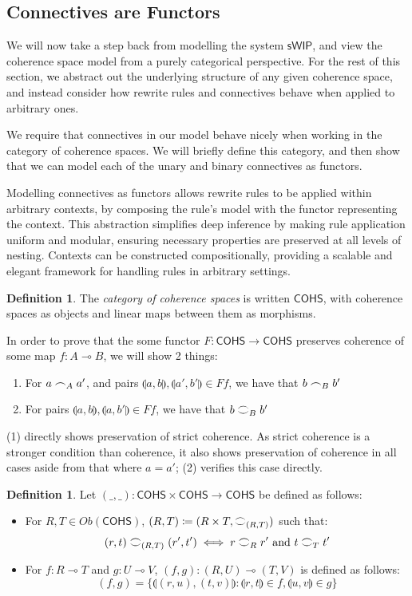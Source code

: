 \documentclass[12pt, oneside]{article}
\theoremstyle{plain}
\theoremstyle{definition}
\newtheorem{definition}[theorem]{Definition}
\newcommand{\lp}{\llparenthesis}
\newcommand{\rp}{\rrparenthesis}
\newcommand{\sSys}{{\mathsf{sWIP}}}%
\newcommand{\cohs}{{\mathsf{COHS}}}
\newcommand{\coh}[1][]{\mathrel{\vcenter{\offinterlineskip\hbox{$\frown$}\vskip0.2ex\hbox{$\smile$}}_{\ifx\\#1\\\else#1\fi}}}
\newcommand{\scoh}[1][]{\mathrel{\frown}_{\ifx\\#1\\\else#1\fi}}
\begin{document}
\subsection{Connectives are Functors}

We will now take a step back from modelling the system $\sSys$, and view the coherence space model from a purely categorical perspective.
For the rest of this section, we abstract out the underlying structure of any given coherence space, and instead consider how rewrite rules and connectives behave when applied to arbitrary ones.

We require that connectives in our model behave nicely when working in the category of coherence spaces.
We will briefly define this category, and then show that we can model each of the unary and binary connectives as functors.

Modelling connectives as functors allows rewrite rules to be applied within arbitrary contexts, by composing the rule's model with the functor representing the context.
This abstraction simplifies deep inference by making rule application uniform and modular, ensuring necessary properties are preserved at all levels of nesting.
Contexts can be constructed compositionally, providing a scalable and elegant framework for handling rules in arbitrary settings.

\begin{definition}
    The \textit{category of coherence spaces} is written $\cohs$, with coherence spaces as objects and linear maps between them as morphisms.
\end{definition}

In order to prove that the some functor $F:\cohs\to\cohs$ preserves coherence of some map $f:A\multimap B$, we will show 2 things:
\begin{enumerate}
    \item
    For $a\scoh[A]a'$, and pairs $\lp a,b\rp,\lp a',b'\rp\in Ff$, we have that $b\scoh[B]b'$
    \item 
    For pairs $\lp a,b\rp,\lp a,b'\rp\in Ff$, we have that $b\coh[B]b'$
\end{enumerate}
(1) directly shows preservation of strict coherence. As strict coherence is a stronger condition than coherence, it also shows preservation of coherence in all cases aside from that where $a=a'$;
(2) verifies this case directly.

\begin{definition}
    Let $(\_,\_):\cohs\times\cohs\to\cohs$ be defined as follows:
    \begin{itemize}
        \item
        For $R,T\in Ob(\cohs)$, $(R,T) \coloneqq (R\times T,\coh[(R,T)])$ such that:
        $$(r,t)\coh[(R,T)](r',t')\iff r\coh[R]r'\text{ and }t\coh[T]t'$$

        \item
        For $f:R\multimap T$ and $g:U\multimap V$, 
        $(f,g):(R,U)\multimap(T,V)$ is defined as follows:
        $$(f,g)=\{\lp(r,u),(t,v)\rp:\lp r,t\rp\in f,\lp u,v\rp\in g\}$$
    \end{itemize}
\end{definition}
\end{document}
